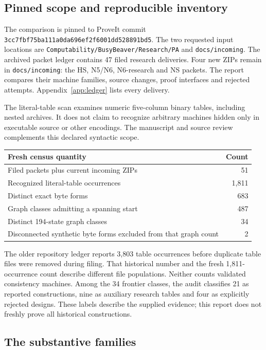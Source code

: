 \documentclass[11pt,letterpaper]{article}
\newcommand{\file}[1]{\texttt{\nolinkurl{#1}}}
\begin{document}
\subsection{Pinned scope and reproducible inventory}

The comparison is pinned to ProveIt commit
\file{3cc7fbf75ba111a0da696ef2f6001dd528891bd5}. The two requested input locations
are \file{Computability/BusyBeaver/Research/PA} and \file{docs/incoming}.
The archived packet ledger contains 47 filed research deliveries. Four new
ZIPs remain in \file{docs/incoming}: the HS, N5/N6, N6-research and NS packets.
The report compares their machine families, source changes, proof interfaces
and rejected attempts. Appendix~\ref{app:ledger} lists every delivery.

The literal-table scan examines numeric five-column binary tables, including
nested archives. It does not claim to recognize arbitrary machines hidden
only in executable source or other encodings. The manuscript and source
review complements this declared syntactic scope.

\begin{center}
\begin{tabular}{@{}lr@{}}\toprule
Fresh census quantity & Count\\\midrule
Filed packets plus current incoming ZIPs & 51\\
Recognized literal-table occurrences & 1,811\\
Distinct exact byte forms & 683\\
Graph classes admitting a spanning start & 487\\
Distinct 194-state graph classes & 34\\
Disconnected synthetic byte forms excluded from that graph count & 2\\\bottomrule
\end{tabular}
\end{center}
The older repository ledger reports 3,803 table occurrences before duplicate
table files were removed during filing. That historical number and the fresh
1,811-occurrence count describe different file populations. Neither counts
validated consistency machines. Among the 34 frontier classes, the audit
classifies 21 as reported constructions, nine as auxiliary research tables
and four as explicitly rejected designs. These labels describe the supplied
evidence; this report does not freshly prove all historical constructions.

\subsection{The substantive families}
\end{document}
